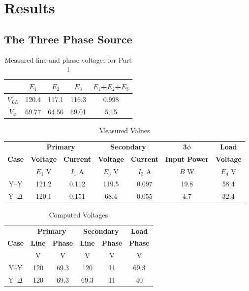 \documentclass{article}
\begin{document}
\section{Results}
\subsection{The Three Phase Source}
\begin{table}[H]
  \centering
  \begin{tabular}{*{5}{c}}
    & \textbf{$E_1$} & \textbf{$E_2$} & \textbf{$E_3$} & \textbf{$E_1$+$E_2$+$E_3$} \\

    \hline

    \textbf{$V_{LL}$} & 120.4 & 117.1 & 116.3 & 0.998 \\
    \textbf{$V_{\phi}$} & 69.77 & 64.56 & 69.01 & 5.15 \\
  \end{tabular}
  \caption{Measured line and phase voltages for Part 1}
  \label{tab:3phase_source}
\end{table}

\begin{table}[H]
  \centering
  \begin{tabular}{*{7}{c}}
    & \multicolumn{2}{c}{\textbf{Primary}} &
    \multicolumn{2}{c}{\textbf{Secondary}} & \textbf{3$\phi$} & \textbf{Load} \\

    \textbf{Case} & \textbf{Voltage} & \textbf{Current} & \textbf{Voltage} &
    \textbf{Current} & \textbf{Input Power} & \textbf{Voltage} \\

    & $E_1$ V & $I_1$ A & $E_3$ V & $I_3$ A & $B$ W & $E_4$ V \\

    \hline
    Y--Y        & 121.2 & 0.112 & 119.5 & 0.097 & 19.8 & 58.4 \\
    Y--$\Delta$ & 120.1 & 0.151 & 68.4 & 0.055 & 4.7 & 32.4 \\
  \end{tabular}
  \caption{Measured Values}
  \label{tab:results}
\end{table}

\begin{table}[H]
  \centering
  \begin{tabular}{*{6}{c}}

    & \multicolumn{2}{c}{\textbf{Primary}}
    & \multicolumn{2}{c}{\textbf{Secondary}} & \textbf{Load} \\

    \textbf{Case} & \textbf{Line} & \textbf{Phase} & \textbf{Line} &
    \textbf{Phase} & \textbf{Phase} \\

    & V & V & V & V & V \\
    \hline

    Y--Y        & 120 & 69.3 & 120 & 11 & 69.3 \\
    Y--$\Delta$ & 120 & 69.3 & 69.3 & 11 & 40 \\
  \end{tabular}
  \caption{Computed Voltages}
  \label{tab:volt_comp}
\end{table}
\end{document}
